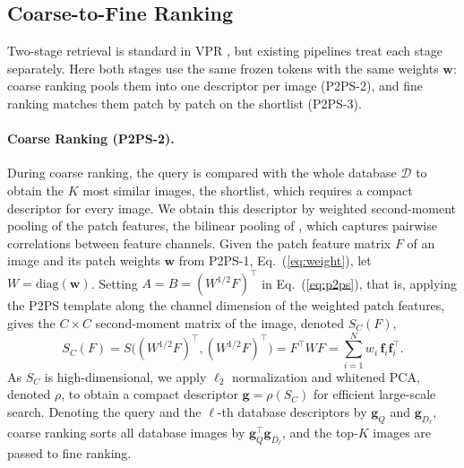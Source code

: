 \subsection{Coarse-to-Fine Ranking}
\label{sec:coarse_to_fine_ranking}
Two-stage retrieval is standard in VPR \citep{patchnetvlad,r2former,selavpr}, but existing pipelines treat each stage separately. Here both stages use the same frozen tokens with the same weights $\mathbf w$: coarse ranking pools them into one descriptor per image (P2PS-2), and fine ranking matches them patch by patch on the shortlist (P2PS-3).

\paragraph{Coarse Ranking (P2PS-2).}
\label{sec:global}
During coarse ranking, the query is compared with the whole database $\mathcal D$ to obtain the $K$ most similar images, the shortlist, which requires a compact descriptor for every image. We obtain this descriptor by weighted second-moment pooling of the patch features, the bilinear pooling of \citet{bcnn}, which captures pairwise correlations between feature channels. Given the patch feature matrix $F$ of an image and its patch weights $\mathbf w$ from P2PS-1, Eq.~(\ref{eq:weight}), let $W=\mathrm{diag}(\mathbf w)$. Setting $A=B=(W^{1/2}F)^{\top}$ in Eq.~(\ref{eq:p2ps}), that is, applying the P2PS template along the channel dimension of the weighted patch features, gives the $C\times C$ second-moment matrix of the image, denoted $S_C(F)$,
\begin{equation}\label{eq:gc}
  S_C(F)=S\big((W^{1/2}F)^{\top},(W^{1/2}F)^{\top}\big)=F^{\top}WF=\sum_{i=1}^{N} w_i\,\mathbf f_i\mathbf f_i^{\top}.
\end{equation}
As $S_C$ is high-dimensional, we apply $\ell_2$ normalization and whitened PCA, denoted $\rho$, to obtain a compact descriptor $\mathbf g=\rho(S_C)$ for efficient large-scale search.  %
Denoting the query and the $\ell$-th database descriptors by $\mathbf g_Q$ and $\mathbf g_{D_\ell}$, coarse ranking sorts all database images by $\mathbf g_Q^{\top}\mathbf g_{D_\ell}$, and the top-$K$ images are passed to fine ranking.

